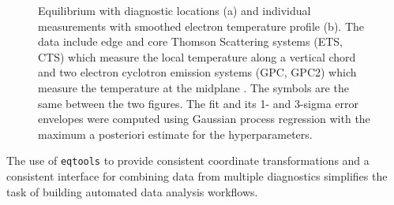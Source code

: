 \documentclass[12pt,floatfix,showpacs]{revtex4-1}
\newcommand{\eqtools}{\texttt{eqtools}\xspace}
\begin{document}
\begin{figure}
	\caption{Equilibrium with diagnostic locations (a) and individual measurements with smoothed electron temperature profile (b). The data include edge \cite{Hughes2003} and core \cite{Hughes2001} Thomson Scattering systems (ETS, CTS) which measure the local temperature along a vertical chord and two electron cyclotron emission systems (GPC, GPC2) which measure the temperature at the midplane \cite{Basse2007}. The symbols are the same between the two figures. The fit and its 1- and 3-sigma error envelopes were computed using Gaussian process regression with the maximum a posteriori estimate for the hyperparameters.}
	\label{fig:profiledemo}
\end{figure}
The use of \eqtools to provide consistent coordinate transformations and a consistent interface for combining data from multiple diagnostics simplifies the task of building automated data analysis workflows.
\end{document}
